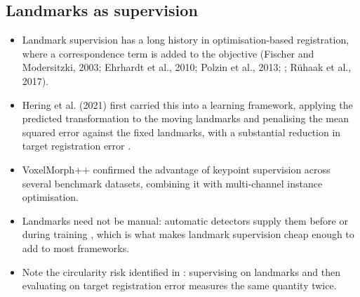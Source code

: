 \subsection{Landmarks as supervision}
\begin{itemize}
\item Landmark supervision has a long history in optimisation-based registration, where a correspondence term is added to the objective (Fischer and Modersitzki, 2003; Ehrhardt et al., 2010; Polzin et al., 2013; \citealp{heinrich2015estimating}; Rühaak et al., 2017). %
\item Hering et al. (2021) first carried this into a learning framework, applying the predicted transformation to the moving landmarks and penalising the mean squared error against the fixed landmarks, with a substantial reduction in target registration error \citep{chen2025survey}. %
\item VoxelMorph++ \citep{heinrich2022voxelmorphplusplus} confirmed the advantage of keypoint supervision across several benchmark datasets, combining it with multi-channel instance optimisation.
\item Landmarks need not be manual: automatic detectors supply them before or during training \citep{heinrich2015estimating}, which is what makes landmark supervision cheap enough to add to most frameworks.
\item Note the circularity risk identified in : supervising on landmarks and then evaluating on target registration error measures the same quantity twice.
\end{itemize}

